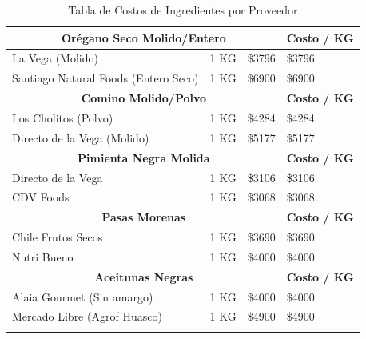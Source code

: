 \documentclass[12pt]{article}
\begin{document}
\begin{longtable}{|| m{4cm} | m{2.5cm} | m{3cm} | m{3cm} ||}
        \multicolumn{3}{||c|}{\textbf{Orégano Seco Molido/Entero}} & \textbf{Costo / KG} \\ [0.5ex] \hline \hline
        La Vega (Molido) & 1 KG & \$\num{3796} & \$\num{3796} \\ \hline
        Santiago Natural Foods (Entero Seco) & 1 KG & \$\num{6900} & \$\num{6900} \\ [1ex] \hline \hline

        \multicolumn{3}{||c|}{\textbf{Comino Molido/Polvo}} & \textbf{Costo / KG} \\ [0.5ex] \hline \hline
        Los Cholitos (Polvo) & 1 KG & \$\num{4284} & \$\num{4284} \\ \hline
        Directo de la Vega (Molido) & 1 KG & \$\num{5177} & \$\num{5177} \\ [1ex] \hline \hline

        \multicolumn{3}{||c|}{\textbf{Pimienta Negra Molida}} & \textbf{Costo / KG} \\ [0.5ex] \hline \hline
        Directo de la Vega & 1 KG & \$\num{3106} & \$\num{3106} \\ \hline
        CDV Foods & 1 KG & \$\num{3068} & \$\num{3068} \\ [1ex] \hline \hline

        \multicolumn{3}{||c|}{\textbf{Pasas Morenas}} & \textbf{Costo / KG} \\ [0.5ex] \hline \hline
        Chile Frutos Secos & 1 KG & \$\num{3690} & \$\num{3690} \\ \hline
        Nutri Bueno & 1 KG & \$\num{4000} & \$\num{4000} \\ [1ex] \hline \hline

        \multicolumn{3}{||c|}{\textbf{Aceitunas Negras}} & \textbf{Costo / KG} \\ [0.5ex] \hline \hline
        Alaia Gourmet (Sin amargo) & 1 KG & \$\num{4000} & \$\num{4000} \\ \hline
        Mercado Libre (Agrof Huasco) & 1 KG & \$\num{4900} & \$\num{4900} \\ [1ex] \hline \hline
    \caption{Tabla de Costos de Ingredientes por Proveedor}
    \label{tab:costos_ingredientes_proveedor}
    \end{longtable}
\newpage
\end{document}
